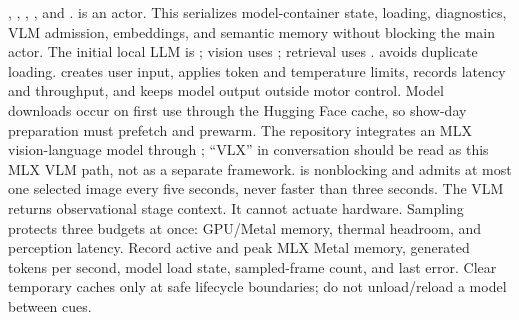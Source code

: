 {}
\markdownRendererSectionEnd \markdownRendererSectionBegin
{}\markdownRendererInterblockSeparator
{}\markdownRendererBlockQuoteBegin
{} , , , , and .\markdownRendererBlockQuoteEnd \markdownRendererInterblockSeparator
{} is an actor. This serializes model-container state, loading, diagnostics, VLM admission, embeddings, and semantic memory without blocking the main actor. The initial local LLM is ; vision uses ; retrieval uses .\markdownRendererParagraphSeparator
{} avoids duplicate loading.  creates user input, applies token and temperature limits, records latency and throughput, and keeps model output outside motor control. Model downloads occur on first use through the Hugging Face cache, so show-day preparation must prefetch and prewarm.\markdownRendererInterblockSeparator
{}\markdownRendererSectionBegin
{}\markdownRendererInterblockSeparator
{}The repository integrates an MLX vision-language model through ; “VLX” in conversation should be read as this MLX VLM path, not as a separate framework.  is nonblocking and admits at most one selected image every five seconds, never faster than three seconds. The VLM returns observational stage context. It cannot actuate hardware.\markdownRendererParagraphSeparator
{}Sampling protects three budgets at once: GPU/Metal memory, thermal headroom, and perception latency. Record active and peak MLX Metal memory, generated tokens per second, model load state, sampled-frame count, and last error. Clear temporary caches only at safe lifecycle boundaries; do not unload/reload a model between cues.\markdownRendererInterblockSeparator
{}
\markdownRendererSectionEnd 
\markdownRendererSectionEnd \markdownRendererSectionBegin
{}\markdownRendererInterblockSeparator
